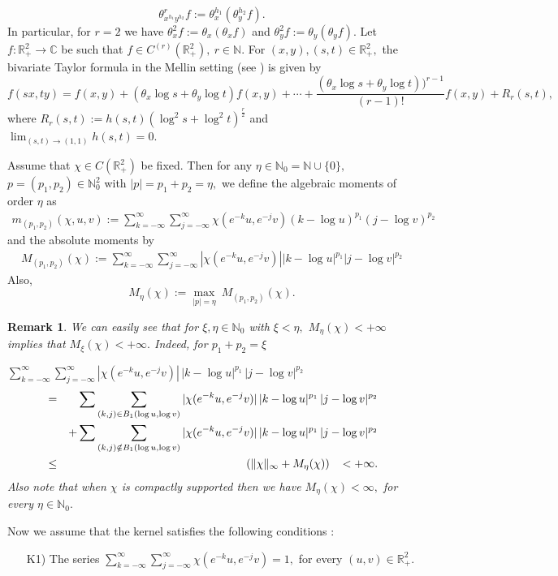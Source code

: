 \documentclass[12pt]{article}
\newtheorem{rmk}{Remark}[section]
\begin{document}
{$$ \theta^{r}_{x^{h_{1}}y^{h_{2}}}f := \theta_{x}^{h_{1}}(\theta_{y}^{h_{2}} f).$$ In particular, for $r=2$ we have
$\theta^{2}_{x}f:= \theta_{x}(\theta_{x}f)$ and $\theta^{2}_{y}f:= \theta_{y}(\theta_{y}f).$
Let $f:\mathbb{R}^{2}_{+} \rightarrow \mathbb{C}$ be such that $f \in C^{(r)}(\mathbb{R}^{2}_{+}),\ r \in \mathbb{N}.$ For $(x,y), (s,t) \in \mathbb{R}^{2}_{+},$ the bivariate Taylor formula in the Mellin setting (see \cite{bvexp}) is given by
$$ f(sx,ty)=f(x,y)+(\theta_{x} \log s+\theta_{y} \log t)f(x,y)+  \cdots + \frac{(\theta_{x} \log s+\theta_{y} \log t))^{r-1}}{(r-1)!}f(x,y)+ R_{r}(s,t),$$ where $R_{r}(s,t):= h(s,t) (\log^{2}s+ \log^{2}t)^{\frac{r}{2}}$ and $\displaystyle \lim_{(s,t)\rightarrow (1,1)} h(s,t) = 0.$

Assume that $\chi\in C( \mathbb{R}^{2}_{+})$ be fixed. Then for any $ \eta \in \mathbb{N}_{0}= \mathbb{N} \cup \{0 \},$ $ p= (p_{1},p_{2})\in \mathbb{N}_{0}^2$ with $ \vert p \vert = p_{1}+p_{2}= \eta,$ we define the algebraic moments of order $\eta$ as
\begin{eqnarray*}
m_{( p_{1},p_{2})} (\chi,u,v):=\sum_{k=-\infty}^{\infty}\sum_{j=-\infty}^{\infty}
\chi(e^{-k}u ,e^{-j}v)(k-\log u)^{p_{1}}(j-\log v)^{p_{2}}
\end{eqnarray*}
and the absolute moments by
\begin{eqnarray*}
M_{( p_{1},p_{2})} (\chi):=\sum_{k=-\infty}^{\infty}\sum_{j=-\infty}^{\infty}|\chi(e^{-k}u ,e^{-j}v)| |k-\log u|^{p_{1}}|j-\log v|^{p_{2}}
\end{eqnarray*}
Also,
$$ M_{\eta}(\chi):= \max_{\vert p \vert = \eta} \  M_{(p_{1},p_{2})} (\chi).$$

\begin{rmk}
We can easily see that for $ \xi,\eta \in \mathbb{N}_{0}$ with $\xi < \eta,$  $ M_{\eta}(\chi)< + \infty$ implies that $M_{\xi}(\chi)< + \infty.$ Indeed, for $p_{1}+p_{2}= \xi$

\noindent $\displaystyle \sum_{k=-\infty}^{\infty}\sum_{j=-\infty}^{\infty}|\chi(e^{-k}u ,e^{-j}v)|\, |k- \log u|^{p_{1}}\, |j-\log v|^{p_{2}}$
\begin{eqnarray*}
 &=& \sum \sum_{(k,j) \in B_{1}(\log u,\log v)} |\chi(e^{-k}u ,e^{-j}v)|\, |k-\log u|^{p_{1}}\, |j-\log v|^{p_{2}} \\&&
 +\sum \sum_{(k,j) \notin B_{1}(\log u,\log v)}|\chi(e^{-k}u ,e^{-j}v)|\, |k-\log u|^{p_{1}}\, |j-\log v|^{p_{2}} \\
&\leq & ( \|\chi \|_{\infty} + M_{\eta}(\chi)) \hspace{0.3cm} < + \infty.
\end{eqnarray*}
Also note that when $\chi$ is compactly supported then we have $ M_{\eta}(\chi)< \infty,$ for every $ \eta \in \mathbb{N}_{0}.$
\end{rmk}
Now we assume that the kernel satisfies the following conditions :
\begin{itemize}
\item[K1)] The series $ \displaystyle{\sum_{k=-\infty}^{\infty}\sum_{j=-\infty}^{\infty}} \chi(e^{-k} u, e^{-j}v) =1 ,$ for every $(u,v) \in \mathbb{R}^{2}_{+}.$


\end{itemize}}
\end{document}
